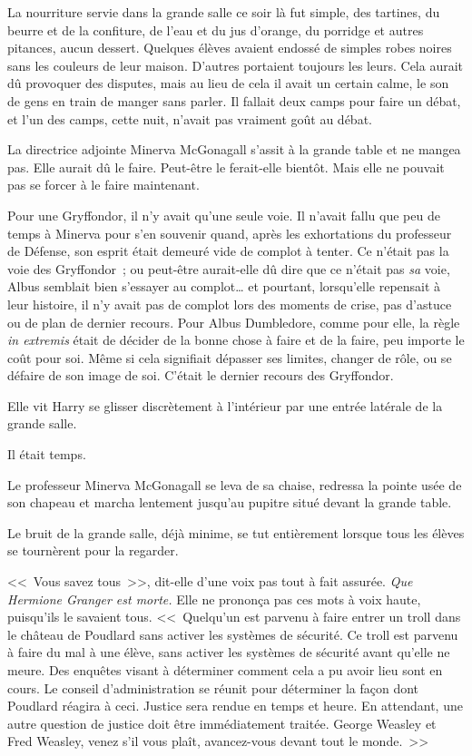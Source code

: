 \later

La nourriture servie dans la grande salle ce soir là fut simple, des tartines, du beurre et de la confiture, de l'eau et du jus d'orange, du porridge et autres pitances, aucun dessert. Quelques élèves avaient endossé de simples robes noires sans les couleurs de leur maison. D'autres portaient toujours les leurs. Cela aurait dû provoquer des disputes, mais au lieu de cela il avait un certain calme, le son de gens en train de manger sans parler. Il fallait deux camps pour faire un débat, et l'un des camps, cette nuit, n'avait pas vraiment goût au débat.

La directrice adjointe Minerva McGonagall s'assit à la grande table et ne mangea pas. Elle aurait dû le faire. Peut-être le ferait-elle bientôt. Mais elle ne pouvait pas se forcer à le faire maintenant.

Pour une Gryffondor, il n'y avait qu'une seule voie. Il n'avait fallu que peu de temps à Minerva pour s'en souvenir quand, après les exhortations du professeur de Défense, son esprit était demeuré vide de complot à tenter. Ce n'était pas la voie des Gryffondor~; ou peut-être aurait-elle dû dire que ce n'était pas \emph{sa} voie, Albus semblait bien s'essayer au complot… et pourtant, lorsqu'elle repensait à leur histoire, il n'y avait pas de complot lors des moments de crise, pas d'astuce ou de plan de dernier recours. Pour Albus Dumbledore, comme pour elle, la règle \emph{in extremis} était de décider de la bonne chose à faire et de la faire, peu importe le coût pour soi. Même si cela signifiait dépasser ses limites, changer de rôle, ou se défaire de son image de soi. C'était le dernier recours des Gryffondor.

Elle vit Harry se glisser discrètement à l'intérieur par une entrée latérale de la grande salle.

Il était temps.

Le professeur Minerva McGonagall se leva de sa chaise, redressa la pointe usée de son chapeau et marcha lentement jusqu'au pupitre situé devant la grande table.

Le bruit de la grande salle, déjà minime, se tut entièrement lorsque tous les élèves se tournèrent pour la regarder.

<<~Vous savez tous~>>, dit-elle d'une voix pas tout à fait assurée. \emph{Que Hermione Granger est morte.} Elle ne prononça pas ces mots à voix haute, puisqu'ils le savaient tous. <<~Quelqu'un est parvenu à faire entrer un troll dans le château de Poudlard sans activer les systèmes de sécurité. Ce troll est parvenu à faire du mal à une élève, sans activer les systèmes de sécurité avant qu'elle ne meure. Des enquêtes visant à déterminer comment cela a pu avoir lieu sont en cours. Le conseil d'administration se réunit pour déterminer la façon dont Poudlard réagira à ceci. Justice sera rendue en temps et heure. En attendant, une autre question de justice doit être immédiatement traitée. George Weasley et Fred Weasley, venez s'il vous plaît, avancez-vous devant tout le monde.~>>

